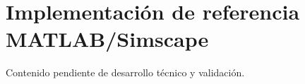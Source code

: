 \section{Implementación de referencia MATLAB/Simscape}

Contenido pendiente de desarrollo técnico y validación.
